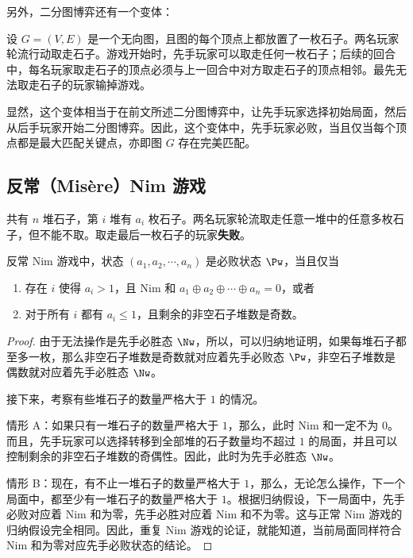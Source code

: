另外，二分图博弈还有一个变体：

\begin{game}[二分图博弈的变体]
	设 $G=(V,E)$ 是一个无向图，且图的每个顶点上都放置了一枚石子。两名玩家轮流行动取走石子。游戏开始时，先手玩家可以取走任何一枚石子；后续的回合中，每名玩家取走石子的顶点必须与上一回合中对方取走石子的顶点相邻。最先无法取走石子的玩家输掉游戏。
\end{game}

显然，这个变体相当于在前文所述二分图博弈中，让先手玩家选择初始局面，然后从后手玩家开始二分图博弈。因此，这个变体中，先手玩家必败，当且仅当每个顶点都是最大匹配关键点，亦即图 $G$ 存在完美匹配。

\subsection{反常（Mis\`ere）Nim 游戏}

\begin{game}[反常 Nim]
	共有 $n$ 堆石子，第 $i$ 堆有 $a_i$ 枚石子。两名玩家轮流取走任意一堆中的任意多枚石子，但不能不取。取走最后一枚石子的玩家\textbf{失败}。
\end{game}

\begin{theorem}
	反常 Nim 游戏中，状态 $(a_1,a_2,\cdots,a_n)$ 是必败状态 $\Pw$，当且仅当
	\begin{enumerate}
		\item 存在 $i$ 使得 $a_i>1$，且 Nim 和 $a_1\oplus a_2\oplus\cdots\oplus a_n=0$，或者
		\item 对于所有 $i$ 都有 $a_i\le 1$，且剩余的非空石子堆数是奇数。
	\end{enumerate}
\end{theorem}

\begin{proof}
	由于无法操作是先手必胜态 $\Nw$，所以，可以归纳地证明，如果每堆石子都至多一枚，那么非空石子堆数是奇数就对应着先手必败态 $\Pw$，非空石子堆数是偶数就对应着先手必胜态 $\Nw$。
	
	接下来，考察有些堆石子的数量严格大于 $1$ 的情况。
	
	情形 A：如果只有一堆石子的数量严格大于 $1$，那么，此时 Nim 和一定不为 $0$。而且，先手玩家可以选择转移到全部堆的石子数量均不超过 $1$ 的局面，并且可以控制剩余的非空石子堆数的奇偶性。因此，此时为先手必胜态 $\Nw$。
	
	情形 B：现在，有不止一堆石子的数量严格大于 $1$，那么，无论怎么操作，下一个局面中，都至少有一堆石子的数量严格大于 $1$。根据归纳假设，下一局面中，先手必败对应着 Nim 和为零，先手必胜对应着 Nim 和不为零。这与正常 Nim 游戏的归纳假设完全相同。因此，重复 Nim 游戏的论证，就能知道，当前局面同样符合 Nim 和为零对应先手必败状态的结论。
\end{proof}

